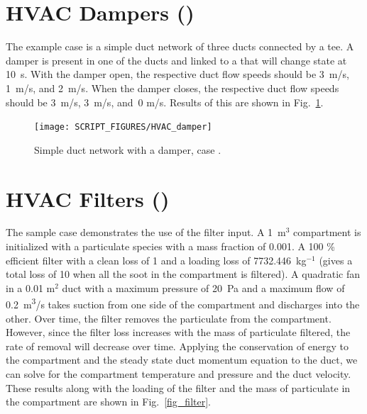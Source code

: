 \documentclass[11pt]{book}
\begin{document}
\section{HVAC Dampers (\texorpdfstring{}{HVAC\_damper})}
\label{HVAC_damper}

The  example case is a simple duct network of three ducts connected by a tee.  A damper is present in one of the ducts and linked to a  that will change state at 10~s.  With the damper open, the respective duct flow speeds should be 3~m/s, 1~m/s, and 2~m/s.  When the damper closes, the respective duct flow speeds should be 3~m/s, 3~m/s, and~0 m/s.  Results of this are shown in Fig.~\ref{fig:HVAC_damper}.

\begin{figure}[h!]
\centering
\texttt{[image: SCRIPT\_FIGURES/HVAC\_damper]}
\caption[Example case ]{Simple duct network with a damper, case .}
\label{fig:HVAC_damper}
\end{figure}



\section{HVAC Filters (\texorpdfstring{}{HVAC\_filter})}
\label{HVAC_filter}

The sample case  demonstrates the use of the filter input.  A 1~m$^3$ compartment is initialized with a particulate species with a mass fraction of 0.001.  A 100 \% efficient filter with a clean loss of 1 and a loading loss of 7732.446~kg$^{-1}$ (gives a total loss of 10 when all the soot in the compartment is filtered).  A quadratic fan in a 0.01 m$^2$ duct with a maximum pressure of 20~Pa and a maximum flow of 0.2~\si{m^3/s} takes suction from one side of the compartment and discharges into the other.  Over time, the filter removes the particulate from the compartment.  However, since the filter loss increases with the mass of particulate filtered, the rate of removal will decrease over time.  Applying the conservation of energy to the compartment and the steady state duct momentum equation to the duct, we can solve for the compartment temperature and pressure and the duct velocity.  These results along with the loading of the filter and the mass of particulate in the compartment are shown in Fig.~\ref{fig_filter}.
\end{document}
